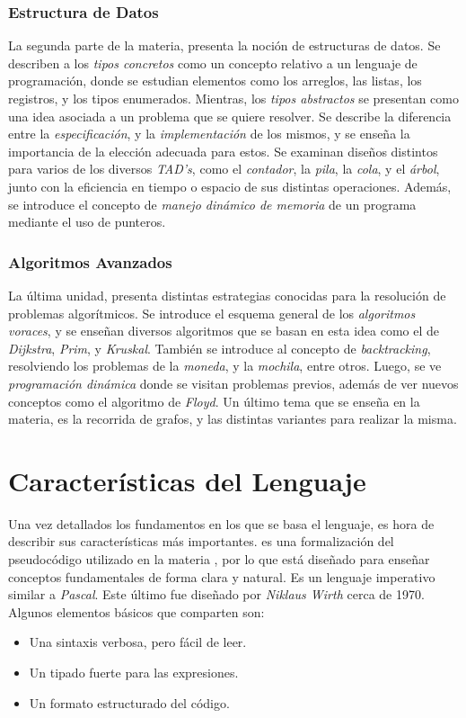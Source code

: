 \subsubsection{Estructura de Datos}

La segunda parte de la materia, presenta la noción de estructuras de datos.
Se describen a los \textit{tipos concretos} como un concepto relativo a un lenguaje de programación, donde se estudian elementos como los arreglos, las listas, los registros, y los tipos enumerados.
Mientras, los \textit{tipos abstractos} se presentan como una idea asociada a un problema que se quiere resolver.
Se describe la diferencia entre la \textit{especificación}, y la \textit{implementación} de los mismos, y se enseña la importancia de la elección adecuada para estos.
Se examinan diseños distintos para varios de los diversos \textit{TAD's}, como el \textit{contador}, la \textit{pila}, la \textit{cola}, y el \textit{árbol}, junto con la eficiencia en tiempo o espacio de sus distintas operaciones.
Además, se introduce el concepto de \textit{manejo dinámico de memoria} de un programa mediante el uso de punteros.

\subsubsection{Algoritmos Avanzados}

La última unidad, presenta distintas estrategias conocidas para la resolución de problemas algorítmicos.
Se introduce el esquema general de los \textit{algoritmos voraces}, y se enseñan diversos algoritmos que se basan en esta idea como el de \textit{Dijkstra}, \textit{Prim}, y \textit{Kruskal}.
También se introduce al concepto de \textit{backtracking}, resolviendo los problemas de la \textit{moneda}, y la \textit{mochila}, entre otros.
Luego, se ve \textit{programación dinámica} donde se visitan problemas previos, además de ver nuevos conceptos como el algoritmo de \textit{Floyd}.
Un último tema que se enseña en la materia, es la recorrida de grafos, y las distintas variantes para realizar la misma.

\section{Características del Lenguaje}

Una vez detallados los fundamentos en los que se basa el lenguaje, es hora de describir sus características más importantes.
\Lenguaje{} es una formalización del pseudocódigo utilizado en la materia \Materia{}, por lo que está diseñado para enseñar conceptos fundamentales de forma clara y natural.
Es un lenguaje imperativo similar a \textit{Pascal}.
Este último fue diseñado por \textit{Niklaus Wirth} cerca de 1970.
Algunos elementos básicos que comparten son:
\begin{itemize}
    \item Una sintaxis verbosa, pero fácil de leer.
    \item Un tipado fuerte para las expresiones.
    \item Un formato estructurado del código.
\end{itemize}

